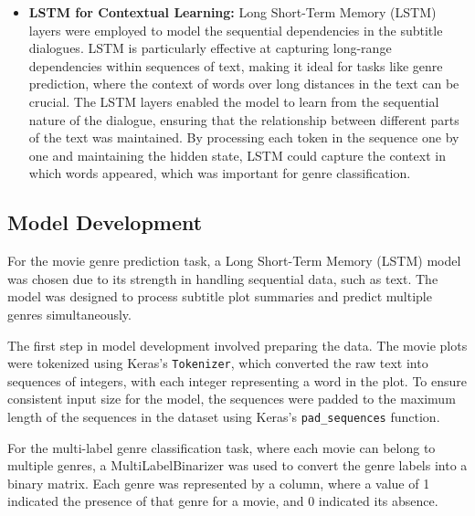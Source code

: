 \documentclass[conference]{IEEEtran}
\begin{document}
\begin{itemize}
    \item \textbf{LSTM for Contextual Learning:} Long Short-Term Memory (LSTM) layers were employed to model the sequential dependencies in the subtitle dialogues. LSTM is particularly effective at capturing long-range dependencies within sequences of text, making it ideal for tasks like genre prediction, where the context of words over long distances in the text can be crucial. The LSTM layers enabled the model to learn from the sequential nature of the dialogue, ensuring that the relationship between different parts of the text was maintained. By processing each token in the sequence one by one and maintaining the hidden state, LSTM could capture the context in which words appeared, which was important for genre classification.
\end{itemize}


\subsection{Model Development}
For the movie genre prediction task, a Long Short-Term Memory (LSTM) model was chosen due to its strength in handling sequential data, such as text. The model was designed to process subtitle plot summaries and predict multiple genres simultaneously.

The first step in model development involved preparing the data. The movie plots were tokenized using Keras's \texttt{Tokenizer}, which converted the raw text into sequences of integers, with each integer representing a word in the plot. To ensure consistent input size for the model, the sequences were padded to the maximum length of the sequences in the dataset using Keras's \texttt{pad\_sequences} function.

For the multi-label genre classification task, where each movie can belong to multiple genres, a MultiLabelBinarizer was used to convert the genre labels into a binary matrix. Each genre was represented by a column, where a value of 1 indicated the presence of that genre for a movie, and 0 indicated its absence.
\end{document}
